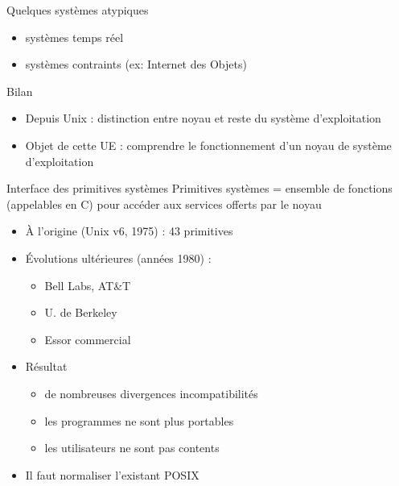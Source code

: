 \begin {frame} {Quelques systèmes atypiques}
    \begin {itemize}
	\item systèmes temps réel
	\item systèmes contraints (ex: Internet des Objets)
    \end {itemize}
\end {frame}

\begin {frame} {Bilan}
    \begin {itemize}
	\item Depuis Unix : distinction entre noyau et reste du système
	    d'exploitation

	\item Objet de cette UE : comprendre le fonctionnement d'un noyau
	    de système d'exploitation

    \end {itemize}

\end {frame}



\begin {frame} {Interface des primitives systèmes}
    Primitives systèmes = ensemble de fonctions (appelables en C)
    pour accéder aux services offerts par le noyau

    \begin {itemize}
	\item À l'origine (Unix v6, 1975) : 43 primitives
	\item Évolutions ultérieures (années 1980) :
	    \begin {itemize}
		\item Bell Labs, AT\&T
		\item U. de Berkeley
		\item Essor commercial
	    \end {itemize}
	\item Résultat
	    \begin {itemize}
		\item de nombreuses divergences \implique incompatibilités
		\item les programmes ne sont plus portables
		\item les utilisateurs ne sont pas contents
	    \end {itemize}
	\item Il faut normaliser l'existant \implique POSIX
    \end {itemize}

\end {frame}

